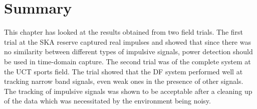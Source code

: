 \section{Summary}
This chapter has looked at the results obtained from two field trials. The first trial at the SKA reserve captured real impulses and showed that since there was no similarity between different types of impulsive signals, power detection should be used in time-domain capture. The second trial was of the complete system at the UCT sports field. The trial showed that the DF system performed well at tracking narrow band signals, even weak ones in the presence of other signals. The tracking of impulsive signals was shown to be acceptable after a cleaning up of the data which was necessitated by the environment being noisy.
